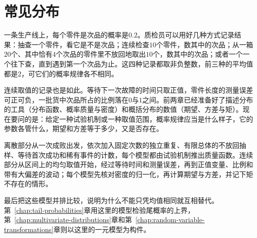 \chapter{常见分布}
\label{chap:common-distributions}

一条生产线上，每个零件是次品的概率是$0.2$。质检员可以用好几种方式记录结果：抽查一个零件，看它是不是次品；连续检查$10$个零件，数其中的次品；从一箱$20$个、其中恰有$4$个次品的零件里不放回地取出$10$个，数其中的次品；或者一个一个往下查，直到遇到第一个次品为止。这四种记录都取非负整数，前三种的平均值都是$2$，可它们的概率规律各不相同。

连续取值的记录也是如此。等待下一次故障的时间只取正值，零件长度的测量误差可正可负，一批货中次品所占的比例落在$0$与$1$之间。前两章已经准备好了描述分布的工具（分布函数、概率质量与密度）和概括分布的数值（期望、方差与矩）。现在要问的是：给定一种试验机制或一种取值范围，概率规律应当是什么样子，它的参数各管什么，期望和方差等于多少，又是否存在。

离散部分从一次成败出发，依次加入固定次数的独立重复、有限总体的不放回抽样、等待首次成功和稀有事件的计数，每个模型都由试验机制推出质量函数。连续部分从区间上的均匀取值开始，经过等待时间和测量误差，再到正值变量、比例和带有大偏差的波动；每个模型先核对密度的归一化，再计算期望与方差，并记下矩不存在的情形。

最后把这些模型并排比较，说明为什么不能只凭均值相同就互相替代。第~\ref{chap:tail-probabilities}章用这里的模型检验尾概率的上界，第~\ref{chap:multivariate-distributions}章和第~\ref{chap:random-variable-transformations}章则以这里的一元模型为构件。








